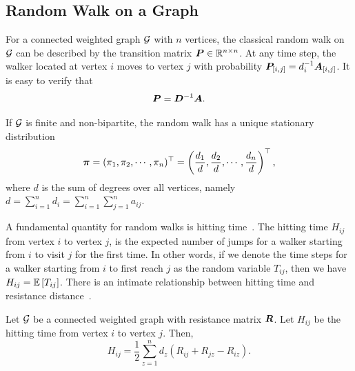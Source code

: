 \documentclass[10pt,twocolumn,twoside]{IEEEtran}
\begin{document}


\subsection{Random Walk on a Graph}

For a connected weighted graph \(\mathcal{G}\) with \(n\) vertices, the classical random walk on \(\mathcal{G}\) can be described by the transition matrix \(\boldsymbol{P}\in\mathbb{R}^{n\times n}\). At any time step, the walker located at vertex \(i\) moves to vertex \(j\) with probability \({\boldsymbol{P}_{[i,j]}=d_i^{-1}\boldsymbol{A}_{[i,j]}}\).
It is easy to verify that
\begin{equation}\label{eq:trs}
    \boldsymbol{P}=\boldsymbol{D}^{-1}\boldsymbol{A}.
\end{equation}

If  \(\mathcal{G}\) is  finite and non-bipartite, the random walk  has a unique stationary distribution~\cite{LiZh13PRE}
\begin{equation}\label{EE01}
    \boldsymbol{\pi}=(\pi_1, \pi_2, \cdots, \pi_n)^{\top}=\left(\frac{d_1}{d}, \frac{d_2}{d}, \cdots, \frac{d_n}{d}\right)^{\top},
\end{equation}
where \(d\) is the sum of degrees over all vertices, namely \(d=\sum_{i=1}^n d_i=\sum_{i=1}^{n}\sum_{j=1}^{n} a_{ij}\).

A fundamental quantity for random walks is hitting time~\cite{Lo93,CoBeTeVoKl07}. The hitting time \(H_{ij}\) from vertex \(i\) to vertex \(j\),  is the expected number of jumps for a walker starting  from \(i\) to visit \(j\) for the first time.
In other words, if we denote the time steps for a walker starting from \(i\) to first reach \(j\) as the random variable \(T_{ij}\), then we have \(H_{ij}=\mathbb{E}\left[T_{ij}\right]\).
There is an intimate relationship between hitting time and resistance distance~\cite{Te91}.
\begin{lemma}
    Let \(\mathcal{G}\) be a connected weighted graph with  resistance matrix  \(\boldsymbol{R}\). Let \(H_{ij}\) be the hitting time  from vertex \(i\) to vertex \(j\). Then,
    \begin{equation}\label{EE03}
        H_{ij}=\frac{1}{2}\sum_{z=1}^{n} d_z(R_{ij}+R_{jz}-R_{iz}).
    \end{equation}
\end{lemma}
\end{document}
